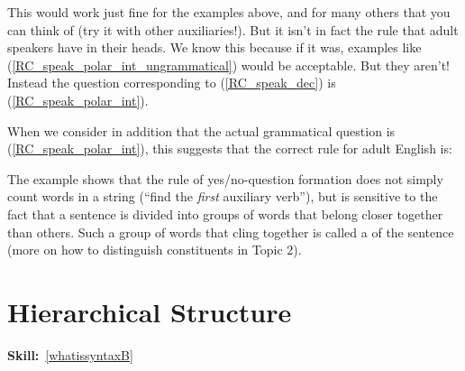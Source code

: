 \documentclass{article}
\begin{document}
\begin{exe}
\end{exe}
This would work just fine for the examples above, and for many others that you can think of (try it with other auxiliaries!).
But it isn't in fact the rule that adult speakers have in their heads.
We know this because if it was, examples like (\ref{RC_speak_polar_int_ungrammatical}) would be acceptable.
But they aren't!
Instead the question corresponding to (\ref{RC_speak_dec}) is (\ref{RC_speak_polar_int}). 
\begin{exe}
\end{exe}
When we consider in addition that the actual grammatical question is (\ref{RC_speak_polar_int}), this suggests that the correct rule for adult English is:
\begin{exe}
\end{exe}

The example shows that the rule of yes/no-question formation does not simply count words in a string (``find the \emph{first} auxiliary verb''), but is sensitive to the fact that a sentence is divided into groups of words that belong closer together than others.
Such a group of words that cling together is called a  of the sentence (more on how to distinguish constituents in Topic 2).

\section{Hierarchical Structure}
\hfill{}\textbf{Skill:}~\ref{whatissyntaxB}
\end{document}
